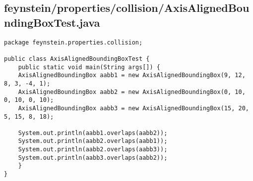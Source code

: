 \subsection*{feynstein/properties/collision/AxisAlignedBoundingBoxTest.java}
\begin{lstlisting}
package feynstein.properties.collision;

public class AxisAlignedBoundingBoxTest {
    public static void main(String args[]) {
	AxisAlignedBoundingBox aabb1 = new AxisAlignedBoundingBox(9, 12, 8, 3, -4, 1);
	AxisAlignedBoundingBox aabb2 = new AxisAlignedBoundingBox(0, 10, 0, 10, 0, 10);
	AxisAlignedBoundingBox aabb3 = new AxisAlignedBoundingBox(15, 20, 5, 15, 8, 18);

	System.out.println(aabb1.overlaps(aabb2));
	System.out.println(aabb2.overlaps(aabb1));
	System.out.println(aabb2.overlaps(aabb3));
	System.out.println(aabb3.overlaps(aabb2));
    }
}\end{lstlisting}

